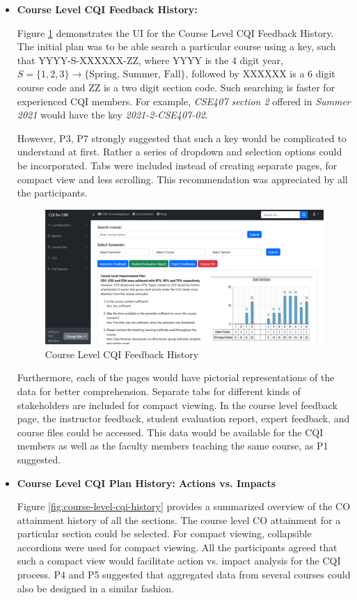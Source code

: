 \documentclass[journal,onecolumn]{IEEEtran}
\begin{document}
\begin{itemize}
 \item \textbf{Course Level CQI Feedback History:}

Figure \ref{fig:Course-Level-CQI-Feedback-Historyl} demonstrates the UI for the Course Level CQI Feedback History. The initial plan was to be able search a particular course using a key, such that YYYY-S-XXXXXX-ZZ, where YYYY is the 4 digit year, \(S=\{1,2,3\} \rightarrow \{\text{Spring, Summer, Fall}\}\), followed by XXXXXX is a 6 digit course code and ZZ is a two digit section code. Such searching is faster for experienced CQI members. For example, \textit{CSE407 section 2} offered in \textit{Summer 2021} would have the key \textit{2021-2-CSE407-02}.

However, P3, P7 strongly suggested that such a key would be complicated to understand at first. Rather a series of dropdown and selection options could be incorporated. Tabs were included instead of creating separate pages, for compact view and less scrolling. This recommendation was appreciated by all the participants. 

\begin{figure}
    \centering
    \includegraphics[width=0.8\linewidth]{img/Picture9.png}
    \caption{Course Level CQI Feedback History}
    \label{fig:Course-Level-CQI-Feedback-Historyl}
\end{figure}

Furthermore, each of the pages would have pictorial representations of the data for better comprehension. Separate tabs for different kinds of stakeholders are included for compact viewing. In the course level feedback page, the instructor feedback, student evaluation report, expert feedback, and course files could be accessed. This data would be available for the CQI members as well as the faculty members teaching the same course, as P1 suggested. 

 \item \textbf{Course Level CQI Plan History: Actions vs. Impacts}

Figure \ref{fig:course-level-cqi-history} provides a summarized overview of the CO attainment history of all the sections. The course level CO attainment for a particular section could be selected. For compact viewing, collapsible accordions were used for compact viewing. All the participants agreed that such a compact view would facilitate action vs. impact analysis for the CQI process. P4 and P5 suggested that aggregated data from several courses could also be designed in a similar fashion.




\end{itemize}
\end{document}
